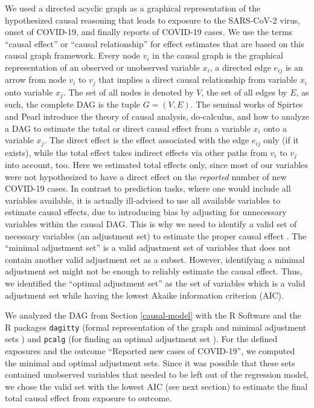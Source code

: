 \documentclass[]{elsarticle} %
\begin{document}
We used a directed acyclic graph as a graphical representation of the hypothesized causal reasoning that leads to exposure to the SARS-CoV-2 virus, onset of COVID-19, and finally reports of COVID-19 cases. We use the terms ``causal effect'' or ``causal relationship'' for effect estimates that are based on this causal graph framework. Every node \(v_i\) in the causal graph is the graphical representation of an observed or unobserved variable \(x_i\), a directed edge \(e_{ij}\) is an arrow from node \(v_i\) to \(v_j\) that implies a direct causal relationship from variable \(x_i\) onto variable \(x_j\). The set of all nodes is denoted by \(V\), the set of all edges by \(E\), as such, the complete DAG is the tuple \(G=(V,E)\). The seminal works of Spirtes and Pearl \citep{spirtes2000causation, pearl2009causality} introduce the theory of causal analysis, do-calculus, and how to analyze a DAG to estimate the total or direct causal effect from a variable \(x_i\) onto a variable \(x_j\). The direct effect is the effect associated with the edge \(e_{ij}\) only (if it exists), while the total effect takes indirect effects via other paths from \(v_i\) to \(v_j\) into account, too. Here we estimated total effects only, since most of our variables were not hypothesized to have a direct effect on the \emph{reported} number of new COVID-19 cases. In contrast to prediction tasks, where one would include all variables available, it is actually ill-advised to use all available variables to estimate causal effects, due to introducing bias by adjusting for unnecessary variables within the causal DAG. This is why we need to identify a valid set of necessary variables (an adjustment set) to estimate the proper causal effect \citep{pearl2009causality}. The ``minimal adjustment set'' \citep{greenland1999causal} is a valid adjustment set of variables that does not contain another valid adjustment set as a subset. However, identifying a minimal adjustment set might not be enough to reliably estimate the causal effect. Thus, we identified the ``optimal adjustment set'' \citep{henckel2019graphical} as the set of variables which is a valid adjustment set while having the lowest Akaike information criterion (AIC).

We analyzed the DAG from Section \ref{causal-model} with the R Software \citep{rsoftware} and the R packages \texttt{dagitty} (formal representation of the graph and minimal adjustment sets \citep{textor_robust_2017}) and \texttt{pcalg} (for finding an optimal adjustment set \citep{pcalg}). For the defined exposures and the outcome ``Reported new cases of COVID-19'', we computed the minimal and optimal adjustment sets. Since it was possible that these sets contained unobserved variables that needed to be left out of the regression model, we chose the valid set with the lowest AIC (see next section) to estimate the final total causal effect from exposure to outcome.
\end{document}
